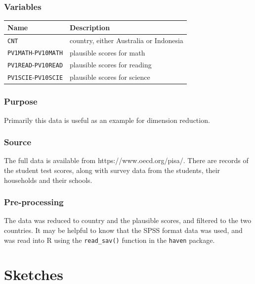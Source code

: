 \documentclass[
  letterpaper,
]{krantz}
\newcounter{none} %
\begin{document}
\subsubsection*{Variables}\label{variables-4}

{\def\LTcaptype{none} %
\begin{longtable}[]{@{}ll@{}}
\toprule\noalign{}
Name & Description \\
\midrule\noalign{}
\endhead
\bottomrule\noalign{}
\endlastfoot
\texttt{CNT} & country, either Australia or Indonesia \\
\texttt{PV1MATH}-\texttt{PV10MATH} & plausible scores for math \\
\texttt{PV1READ}-\texttt{PV10READ} & plausible scores for reading \\
\texttt{PV1SCIE}-\texttt{PV10SCIE} & plausible scores for science \\
\end{longtable}
}

\subsubsection*{Purpose}\label{purpose-4}

Primarily this data is useful as an example for dimension reduction.

\subsubsection*{Source}\label{source-4}

The full data is available from https://www.oecd.org/pisa/. There are
records of the student test scores, along with survey data from the
students, their households and their schools.

\subsubsection*{Pre-processing}\label{pre-processing-4}

The data was reduced to country and the plausible scores, and filtered
to the two countries. It may be helpful to know that the SPSS format
data was used, and was read into R using the \texttt{read\_sav()}
function in the \texttt{haven} package.

\section{Sketches}\label{sketches}
\end{document}

